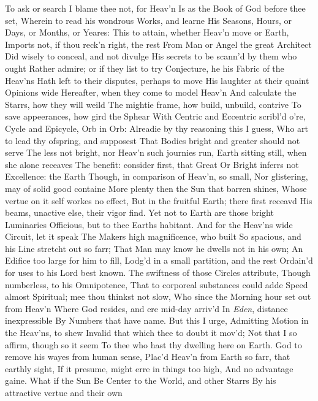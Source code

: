 \documentclass[11pt]{book}
\newcounter {first}
\begin{document}
\quad To ask or search I blame thee not, for Heav'n 
Is as the Book of God before thee set, 
Wherein to read his wondrous Works, and learne 
His Seasons, Hours, or Days, or Months, or Yeares: 
This to attain, whether Heav'n move or Earth, 
Imports not, if thou reck'n right, the rest 
From Man or Angel the great Architect 
Did wisely to conceal, and not divulge 
His secrets to be scann'd by them who ought 
Rather admire; or if they list to try 
Conjecture, he his Fabric of the Heav'ns 
Hath left to their disputes, perhaps to move 
His laughter at their quaint Opinions wide 
Hereafter, when they come to model Heav'n 
And calculate the Starrs, how they will weild 
The mightie frame, how build, unbuild, contrive 
To save appeerances, how gird the Sphear 
With Centric and Eccentric scribl'd o're, 
Cycle and Epicycle, Orb in Orb: 
Alreadie by thy reasoning this I guess, 
Who art to lead thy ofspring, and supposest 
That Bodies bright and greater should not serve 
The less not bright, nor Heav'n such journies run, 
Earth sitting still, when she alone receaves 
The benefit: consider first, that Great 
Or Bright inferrs not Excellence: the Earth 
Though, in comparison of Heav'n, so small, 
Nor glistering, may of solid good containe 
More plenty then the Sun that barren shines, 
Whose vertue on it self workes no effect, 
But in the fruitful Earth; there first receavd 
His beams, unactive else, their vigor find. 
Yet not to Earth are those bright Luminaries 
Officious, but to thee Earths habitant. 
And for the Heav'ns wide Circuit, let it speak 
The Makers high magnificence, who built 
So spacious, and his Line stretcht out so farr; 
That Man may know he dwells not in his own; 
An Edifice too large for him to fill, 
Lodg'd in a small partition, and the rest 
Ordain'd for uses to his Lord best known. 
The swiftness of those Circles attribute, 
Though numberless, to his Omnipotence, 
That to corporeal substances could adde 
Speed almost Spiritual; mee thou thinkst not slow, 
Who since the Morning hour set out from Heav'n 
Where God resides, and ere mid-day arriv'd 
In \textit{Eden}, distance inexpressible 
By Numbers that have name.  But this I urge, 
Admitting Motion in the Heav'ns, to shew 
Invalid that which thee to doubt it mov'd; 
Not that I so affirm, though so it seem 
To thee who hast thy dwelling here on Earth. 
God to remove his wayes from human sense, 
Plac'd Heav'n from Earth so farr, that earthly sight, 
If it presume, might erre in things too high, 
And no advantage gaine.  What if the Sun 
Be Center to the World, and other Starrs 
By his attractive vertue and their own 
\end{document}
